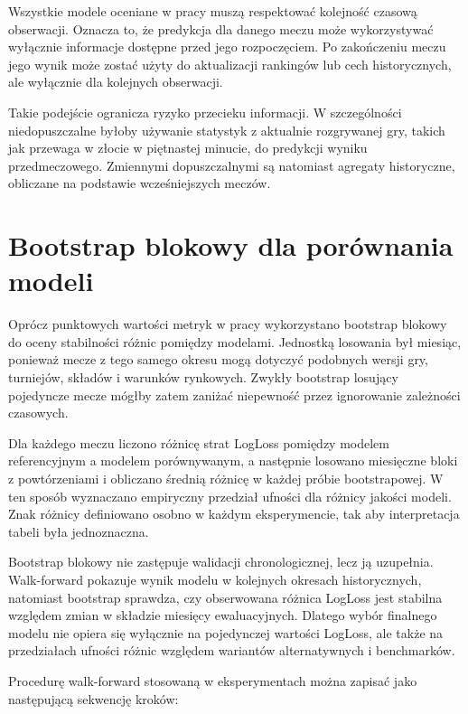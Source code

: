 Wszystkie modele oceniane w pracy muszą respektować kolejność czasową obserwacji. Oznacza to, że predykcja dla danego meczu może wykorzystywać wyłącznie informacje dostępne przed jego rozpoczęciem. Po zakończeniu meczu jego wynik może zostać użyty do aktualizacji rankingów lub cech historycznych, ale wyłącznie dla kolejnych obserwacji.

Takie podejście ogranicza ryzyko przecieku informacji. W szczególności niedopuszczalne byłoby używanie statystyk z aktualnie rozgrywanej gry, takich jak przewaga w złocie w piętnastej minucie, do predykcji wyniku przedmeczowego. Zmiennymi dopuszczalnymi są natomiast agregaty historyczne, obliczane na podstawie wcześniejszych meczów.

\section{Bootstrap blokowy dla porównania modeli}

Oprócz punktowych wartości metryk w pracy wykorzystano bootstrap blokowy do oceny stabilności różnic pomiędzy modelami. Jednostką losowania był miesiąc, ponieważ mecze z tego samego okresu mogą dotyczyć podobnych wersji gry, turniejów, składów i warunków rynkowych. Zwykły bootstrap losujący pojedyncze mecze mógłby zatem zaniżać niepewność przez ignorowanie zależności czasowych.

Dla każdego meczu liczono różnicę strat LogLoss pomiędzy modelem referencyjnym a modelem porównywanym, a następnie losowano miesięczne bloki z powtórzeniami i obliczano średnią różnicę w każdej próbie bootstrapowej. W ten sposób wyznaczano empiryczny przedział ufności dla różnicy jakości modeli. Znak różnicy definiowano osobno w każdym eksperymencie, tak aby interpretacja tabeli była jednoznaczna.

Bootstrap blokowy nie zastępuje walidacji chronologicznej, lecz ją uzupełnia. Walk-forward pokazuje wynik modelu w kolejnych okresach historycznych, natomiast bootstrap sprawdza, czy obserwowana różnica LogLoss jest stabilna względem zmian w składzie miesięcy ewaluacyjnych. Dlatego wybór finalnego modelu nie opiera się wyłącznie na pojedynczej wartości LogLoss, ale także na przedziałach ufności różnic względem wariantów alternatywnych i benchmarków.

Procedurę walk-forward stosowaną w eksperymentach można zapisać jako następującą sekwencję kroków:

